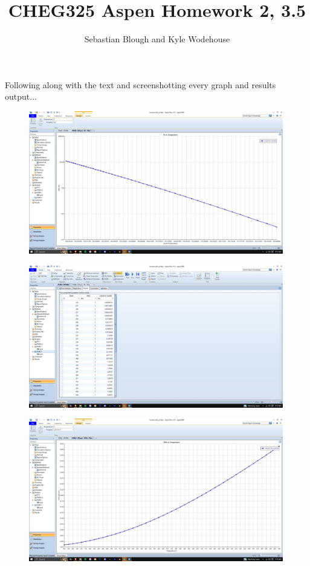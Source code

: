 \documentclass{article}
\title{\bfseries CHEG325 Aspen Homework 2, 3.5}
\author{Sebastian Blough and Kyle Wodehouse}
\date{}
\begin{document}
\maketitle
\noindent
Following along with the text and screenshotting every graph and results output...

\begin{figure}[H]
    \centering
    \includegraphics[width=0.99\textwidth, frame]{img/1 (PL).JPG}
\end{figure}

\begin{figure}[H]
    \centering
    \includegraphics[width=0.99\textwidth, frame]{img/2 (PL table).JPG}
\end{figure}

\begin{figure}[H]
    \centering
    \includegraphics[width=0.99\textwidth, frame]{img/3 (cpig).JPG}
\end{figure}
\end{document}
